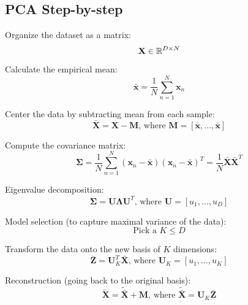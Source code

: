 \documentclass[12pt]{article}
\begin{document}
\subsection{PCA Step-by-step}
\olb
\item Organize the dataset as a matrix:
\[ \mathbf{X}\in \mathbb{R}^{D\times N} \]
\item Calculate the empirical mean:
\[ \bar{\mathbf{x}} = \frac{1}{N} \sum_{n=1}^N \mathbf{x}_n \]
\item Center the data by subtracting mean from each sample:
\[ \bar{\mathbf{X}} = \mathbf{X} - \mathbf{M} \text{, where } \mathbf{M} = [\bar{\mathbf{x}},\dots ,\bar{\mathbf{x}}] \]
\item Compute the covariance matrix:
\[ \mathbf{\Sigma} = \frac{1}{N} \sum_{n=1}^N (\mathbf{x}_n - \bar{\mathbf{x}})(\mathbf{x}_n - \bar{\mathbf{x}})^T = \frac{1}{N} \bar{\mathbf{X}} \bar{\mathbf{X}}^T \]
\item Eigenvalue decomposition:
\[ \mathbf{\Sigma} = \mathbf{U\Lambda U}^T \text{, where } \mathbf{U} = [u_1, \dots ,u_D] \]
\item Model selection (to capture maximal variance of the data):
\[ \text{Pick a } K \leq D \]
\item Transform the data onto the new basis of $K$ dimensions:
\[ \bar{\mathbf{Z}} = \mathbf{U}_K^T \bar{\mathbf{X}} \text{, where } \mathbf{U}_K = [u_1, \dots ,u_K] \]
\item Reconstruction (going back to the original basis):
\[ \widetilde{\mathbf{X}} = \widetilde{\bar{\mathbf{X}}} + \mathbf{M} \text{, where } \widetilde{\bar{\mathbf{X}}} = \mathbf{U}_K \bar{\mathbf{Z}} \]
\ole
\end{document}
